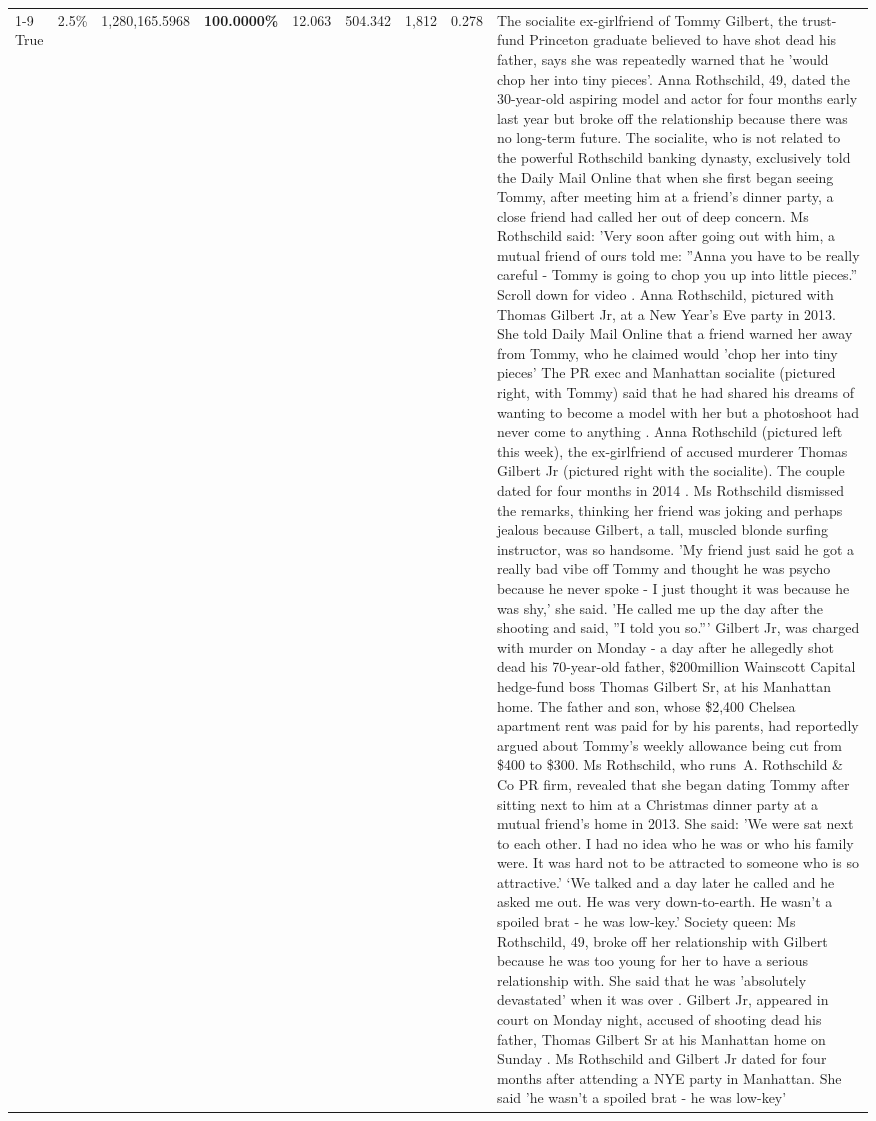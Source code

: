\begin{table}[H]
\begin{tabular}{lllrlllll}
 \\
\cline{1-9}
True & 2.5\% & 1,280,165.5968 & \bfseries \color{red} 100.0000\% & 12.063 & 504.342 & 1,812 & 0.278 & The socialite ex-girlfriend of Tommy Gilbert, the trust-fund Princeton graduate believed to have shot dead his father, says she was repeatedly warned that he 'would chop her into tiny pieces'. Anna Rothschild, 49, dated the 30-year-old aspiring model and actor for four months early last year but broke off the relationship because there was no long-term future. The socialite, who is not related to the powerful Rothschild banking dynasty, exclusively told the Daily Mail Online that when she first began seeing Tommy, after meeting him at a friend's dinner party, a close friend had called her out of deep concern. Ms Rothschild said: 'Very soon after going out with him, a mutual friend of ours told me: ''Anna you have to be really careful - Tommy is going to chop you up into little pieces.'' Scroll down for video . Anna Rothschild, pictured with Thomas Gilbert Jr, at a New Year's Eve party in 2013. She told Daily Mail Online that a friend warned her away from Tommy, who he claimed would 'chop her into tiny pieces' The PR exec and Manhattan socialite (pictured right, with Tommy) said that he had shared his dreams of wanting to become a model with her but a photoshoot had never come to anything . Anna Rothschild (pictured left this week), the ex-girlfriend of accused murderer Thomas Gilbert Jr (pictured right with the socialite). The couple dated for four months in 2014 . Ms Rothschild dismissed the remarks, thinking her friend was joking and perhaps jealous because Gilbert, a tall, muscled blonde surfing instructor, was so handsome. 'My friend just said he got a really bad vibe off Tommy and thought he was psycho because he never spoke - I just thought it was because he was shy,' she said. 'He called me up the day after the shooting and said, ''I told you so.''' Gilbert Jr, was charged with murder on Monday - a day after he allegedly shot dead his 70-year-old father, \$200million Wainscott Capital hedge-fund boss Thomas Gilbert Sr, at his Manhattan home. The father and son, whose \$2,400 Chelsea apartment rent was paid for by his parents, had reportedly argued about Tommy's weekly allowance being cut from \$400 to \$300. Ms Rothschild, who runs A. Rothschild \& Co PR firm, revealed that she began dating Tommy after sitting next to him at a Christmas dinner party at a mutual friend's home in 2013. She said: 'We were sat next to each other. I had no idea who he was or who his family were. It was hard not to be attracted to someone who is so attractive.' ‘We talked and a day later he called and he asked me out. He was very down-to-earth. He wasn’t a spoiled brat - he was low-key.’ Society queen: Ms Rothschild, 49, broke off her relationship with Gilbert because he was too young for her to have a serious relationship with. She said that he was 'absolutely devastated' when it was over . Gilbert Jr, appeared in court on Monday night, accused of shooting dead his father, Thomas Gilbert Sr at his Manhattan home on Sunday . Ms Rothschild and Gilbert Jr dated for four months after attending a NYE party in Manhattan. She said 'he wasn't a spoiled brat - he was low-key' 
\end{tabular}
\end{table}
